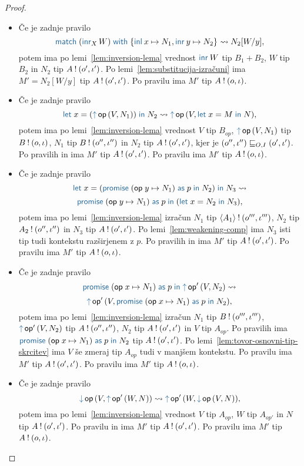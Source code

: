 \begin{proof}
\begin{itemize}
		\item Če je zadnje pravilo $$\tmmatch{(\tminr[X]{W})}{\tminl{x} \mapsto N_1, \tminr{y} \mapsto N_2} \reduces N_2[W/y],$$ potem ima po lemi~\ref{lem:inversion-lema} vrednost $\tminr{W}$ tip $B_1 + B_2$, $W$ tip $B_2$ in $N_2$ tip $A \mathbin{!} (o', \iota')$.
		Po lemi~\ref{lem:substitucija-izračuni} ima $M' = N_2[W/y]$ tip $A \mathbin{!} (o', \iota')$.
		Po pravilu  ima $M'$ tip $A \mathbin{!} (o, \iota)$.
		
		\item Če je zadnje pravilo $$\tmlet{x}{(\tmopout{op}{V}{N_1})}{N_2} \reduces \tmopout{op}{V}{\tmlet{x}{M}{N}},$$ potem ima po lemi~\ref{lem:inversion-lema} vrednost $V$ tip $B_{op}$, $\tmopout{op}{V}{N_1}$ tip $B \mathbin{!} (o, \iota)$, $N_1$ tip $B \mathbin{!} (o'', \iota'')$ in $N_2$ tip $A \mathbin{!} (o', \iota')$, kjer je $(o'', \iota'') \sqsubseteq_{O, I} (o', \iota')$.
		Po pravilih  in  ima $M'$ tip $A \mathbin{!} (o', \iota')$.
		Po pravilu  ima $M'$ tip $A \mathbin{!} (o, \iota)$.
		
		\item Če je zadnje pravilo $$\tmlet{x}{(\tmwith{op}{y}{N_1}{p}{N_2})}{N_3} \reduces$$ $$ \tmwith{op}{y}{N_1}{p}{(\tmlet{x}{N_2}{N_3})},$$ potem ima po lemi~\ref{lem:inversion-lema} izračun $N_1$ tip $\langle A_1 \rangle \mathbin{!} (o''', \iota''')$, $N_2$ tip $A_2 \mathbin{!} (o'', \iota'')$ in $N_3$ tip $A \mathbin{!} (o', \iota')$.
		Po lemi~\ref{lem:weakening-comp} ima $N_3$ isti tip tudi kontekstu razširjenem z $p$.
		Po pravilih  in  ima $M'$ tip $A \mathbin{!} (o', \iota')$.
		Po pravilu  ima $M'$ tip $A \mathbin{!} (o, \iota)$.
		
		\item Če je zadnje pravilo $$\tmwith{op}{x}{N_1}{p}{\tmopout{op'}{V}{N_2}} \reduces$$ $$ \tmopout{op'}{V}{\tmwith{op}{x}{N_1}{p}{N_2}},$$ potem ima po lemi~\ref{lem:inversion-lema} izračun $N_1$ tip $B \mathbin{!} (o''', \iota''')$, $\tmopout{op'}{V}{N_2}$ tip $A \mathbin{!} (o'', \iota'')$, $N_2$ tip $A \mathbin{!} (o', \iota')$ in $V$ tip $A_{op}$.
		Po pravilih  ima $\tmwith{op}{x}{N_1}{p}{N_2}$ tip $A \mathbin{!} (o', \iota')$.
		Po lemi~\ref{lem:tovor-osnovni-tip-skrcitev} ima $V$ še zmeraj tip $A_{op}$ tudi v manjšem kontekstu. Po pravilu  ima $M'$ tip $A \mathbin{!} (o', \iota')$.
		Po pravilu  ima $M'$ tip $A \mathbin{!} (o, \iota)$.
		
		\item Če je zadnje pravilo $$\tmopin{op}{V}{\tmopout{op'}{W}{N}} \reduces \tmopout{op'}{W}{\tmopin{op}{V}{N}},$$ potem ima po lemi~\ref{lem:inversion-lema} vrednost $V$ tip $A_{op}$, $W$ tip $A_{op'}$ in $N$ tip $A \mathbin{!} (o', \iota')$.
		Po pravilu  in  ima $M'$ tip $A \mathbin{!} (o', \iota')$.
		Po pravilu  ima $M'$ tip $A \mathbin{!} (o, \iota)$.
		

\end{itemize}
\end{proof}
